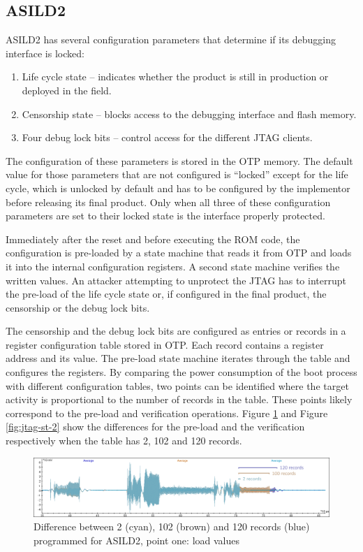 \documentclass[10pt, conference, compsocconf]{IEEEtran}
\newcommand{\ST}{ASILD2\xspace}
\begin{document}
\subsection{\ST}
\ST has several configuration parameters that determine if its debugging interface is locked:
\begin{enumerate}
    \item Life cycle state \label{enum:lifecycle} -- indicates whether the product is still in production or deployed in the field. 
    \item Censorship state \label{enum:censor} -- blocks access to the debugging interface and flash memory. 
    \item Four debug lock bits \label{enum:dbl} -- control access for the different JTAG clients.
\end{enumerate}
The configuration of these parameters is stored in the OTP memory. The default value for those parameters that are not configured is ``locked'' except for the life cycle, which is unlocked by default and has to be configured by the implementor before releasing its final product. Only when all three of these configuration parameters are set to their locked state is the interface properly protected. 

Immediately after the reset and before executing the ROM code, the configuration is pre-loaded by a state machine that reads it from OTP and loads it into the internal configuration registers. A second state machine verifies the written values. An attacker attempting to unprotect the JTAG has to interrupt the pre-load of the life cycle state or, if configured in the final product, the censorship or the debug lock bits. 

The censorship and the debug lock bits are configured as entries or records in a register configuration table stored in OTP. Each record contains a register address and its value. The pre-load state machine iterates through the table and configures the registers. By comparing the power consumption of the boot process with different configuration tables, two points can be identified where the target activity is proportional to the number of records in the table. These points likely correspond to the pre-load and verification operations. Figure \ref{fig:jtag-st} and Figure \ref{fig:jtag-st-2} show the differences for the pre-load and the verification respectively when the table has 2, 102 and 120 records.

\begin{figure}[!t]
  \centering
  \includegraphics[width=\textwidth]{spc570-DPA-records}
  \caption{Difference between 2 (cyan), 102 (brown) and 120 records (blue) programmed for \ST, point one: load values}
  \label{fig:jtag-st}
\end{figure}
\end{document}
